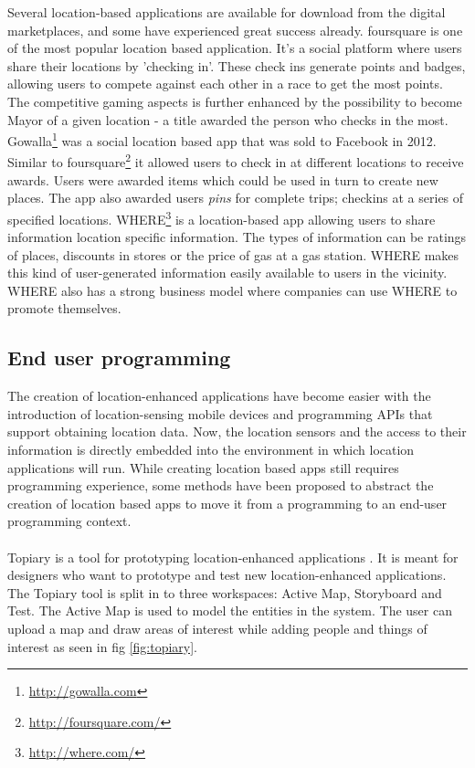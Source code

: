 \noindent Several location-based applications are available for download from the digital marketplaces, and some have experienced great success already. foursquare is one of the most popular location based application. It's a social platform where users share their locations by 'checking in'. These check ins generate points and badges, allowing users to compete against each other in a race to get the most points. The competitive gaming aspects is further enhanced by the possibility to become Mayor of a given location - a title awarded the person who checks in the most. Gowalla\footnote{\url{http://gowalla.com}} was a social location based app that was sold to Facebook in 2012. Similar to foursquare\footnote{\url{http://foursquare.com/}} it allowed users to check in at different locations to receive awards. Users were awarded items which could be used in turn to create new places. The app also awarded users \emph{pins} for complete trips; checkins at a series of specified locations. WHERE\footnote{\url{http://where.com/}} is a location-based app allowing users to share information location specific information. The types of information can be ratings of places, discounts in stores or the price of gas at a gas station. WHERE makes this kind of user-generated information easily available to users in the vicinity. WHERE also has a strong business model where companies can use WHERE to promote themselves. 

\subsection{End user programming} %
\label{sub:end_user_programming}
The creation of location-enhanced applications have become easier with the introduction of location-sensing mobile devices and programming APIs that support obtaining location data. Now, the location sensors and the access to their information is directly embedded into the environment in which location applications will run. While creating location based apps still requires programming experience, some methods have been proposed to abstract the creation of location based apps to move it from a programming to an end-user programming context. 
\\\\
Topiary is a tool for prototyping location-enhanced applications \cite{Li:2004:TTP:1029632.1029671}. It is meant for designers who want to prototype and test new location-enhanced applications. The Topiary tool is split in to three workspaces: Active Map, Storyboard and Test. The Active Map is used to model the entities in the system. The user can upload a map and draw areas of interest while adding people and things of interest as seen in fig \ref{fig:topiary}.
\\

